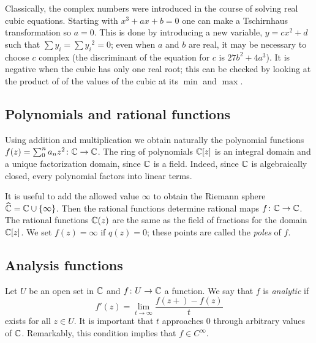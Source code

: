 Classically, the complex numbers were introduced in the course of solving
real cubic equations. Starting with $x^3+ax+b=0$ one can make a Tschirnhaus
transformation so $a=0$. This is done by introducing a new variable,
$y=cx^2+d$ such that $\sum y_i=\sum {y_i}^2=0$; even when $a$ and $b$ are
real, it may be necessary to choose $c$ complex (the discriminant of the
equation for $c$ is $27b^2+4a^3$). It is negative when the cubic has only
one real root; this can be checked by looking at the product of of the
values of the cubic at its $\min$ and $\max$.

\subsection{Polynomials and rational functions}
Using addition and multiplication we obtain naturally the polynomial
functions $f(z)=\sum_0^n a_nz^2\colon\mathbb{C}\to\mathbb{C}$. The ring of polynomials
$\mathbb{C}[z]$ is an integral domain and a unique factorization domain, since
$\mathbb{C}$ is a field. Indeed, since $\mathbb{C}$ is algebraically closed, every
polynomial factors into linear terms.

It is useful to add the allowed value $\infty$ to obtain the Riemann sphere
$\widehat{\mathbb{C}}=\mathbb{C}\cup\{\infty\}$. Then the rational functions determine
rational maps $f\colon\mathbb{C}\to\mathbb{C}$. The rational functions $\mathbb{C}(z)$ are
the same as the field of fractions for the domain $\mathbb{C}[z]$. We set
$f(z)=\infty$ if $q(z)=0$; these points are called the \emph{poles} of $f$.

\subsection{Analysis functions}
Let $U$ be an open set in $\mathbb{C}$ and $f\colon U\to\mathbb{C}$ a function. We say
that $f$ is \emph{analytic} if
\[
f'(z)=\lim_{t\to\infty}\frac{f(z+)-f(z)}{t}
\]
exists for all $z\in U$. It is important that $t$ approaches $0$ through
arbitrary values of $\mathbb{C}$. Remarkably, this condition implies that $f\in
C^\infty$.

